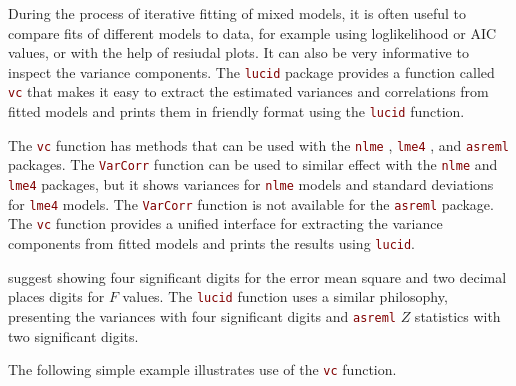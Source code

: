 \documentclass[12pt]{article}\usepackage[]{graphicx}\usepackage[]{color}
\newcommand{\code}[1]{\texttt{\textcolor{maroon}{#1}}}
\begin{document}
During the process of iterative fitting of mixed models, it is often useful
to compare fits of different models to data, for example using
loglikelihood or AIC values, or with the help of resiudal plots.
It can also be very informative to
inspect the variance components.  The \code{lucid} package provides a function
called \code{vc} that makes it easy to extract the estimated variances and
correlations from fitted models and prints them in friendly format
using the \code{lucid} function.

The \code{vc} function has methods that can be used with the
\code{nlme} \citep{pinheiro2014nlme},
\code{lme4} \citep{bates2014lme4}, and
\code{asreml} \citep{butler2009asreml}
packages.
The \code{VarCorr} function can be used to similar effect with the
\code{nlme} and \code{lme4} packages, but it shows variances for \code{nlme}
models and standard deviations for \code{lme4} models.
The \code{VarCorr} function is not available for the
\code{asreml} package.  The \code{vc} function provides a unified interface
for extracting the variance components from fitted models and prints
the results using \code{lucid}.

\cite{pearce1988manual} suggest showing four significant digits for the error
mean square and two decimal places digits for $F$ values.  The \code{lucid}
function uses a similar philosophy, presenting the
variances with four significant digits and \code{asreml} $Z$ statistics with
two significant digits.

The following simple example illustrates use of the \code{vc} function.
\end{document}
